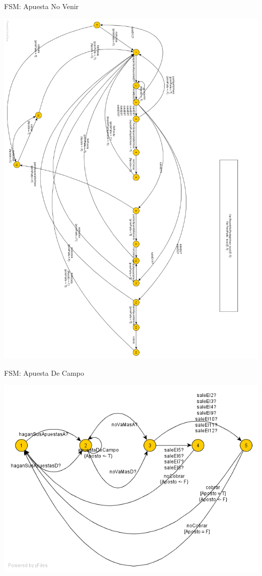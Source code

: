 \newpage
{\large FSM: Apuesta No Venir}
\begin{center}
\includegraphics[scale=0.35]{img/apuestaNoVenir.png}
\end{center}

\newpage
{\large FSM: Apuesta De Campo}
\begin{center}
\includegraphics[scale=0.5]{img/apuestaDeCampo.png}
\end{center}

